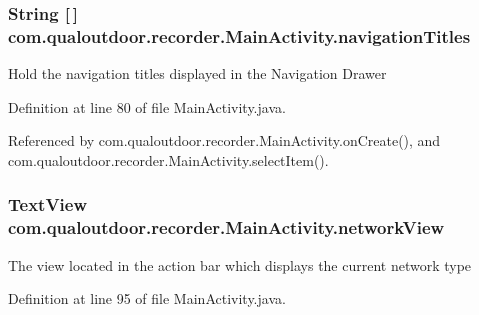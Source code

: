 \hypertarget{classcom_1_1qualoutdoor_1_1recorder_1_1MainActivity_aebfe9b8493ba8495d570e4aff04aa98f}{
\subsubsection[{navigation\-Titles}]{\setlength{\rightskip}{0pt plus 5cm}String \mbox{[}$\,$\mbox{]} com.\-qualoutdoor.\-recorder.\-Main\-Activity.\-navigation\-Titles\hspace{0.3cm}{\ttfamily [private]}}}\label{classcom_1_1qualoutdoor_1_1recorder_1_1MainActivity_aebfe9b8493ba8495d570e4aff04aa98f}
Hold the navigation titles displayed in the Navigation Drawer 

Definition at line 80 of file Main\-Activity.\-java.



Referenced by com.\-qualoutdoor.\-recorder.\-Main\-Activity.\-on\-Create(), and com.\-qualoutdoor.\-recorder.\-Main\-Activity.\-select\-Item().

\hypertarget{classcom_1_1qualoutdoor_1_1recorder_1_1MainActivity_a318bc02d4937447fc88bab0f12a6df64}{
\subsubsection[{network\-View}]{\setlength{\rightskip}{0pt plus 5cm}Text\-View com.\-qualoutdoor.\-recorder.\-Main\-Activity.\-network\-View\hspace{0.3cm}{\ttfamily [private]}}}\label{classcom_1_1qualoutdoor_1_1recorder_1_1MainActivity_a318bc02d4937447fc88bab0f12a6df64}
The view located in the action bar which displays the current network type 

Definition at line 95 of file Main\-Activity.\-java.

